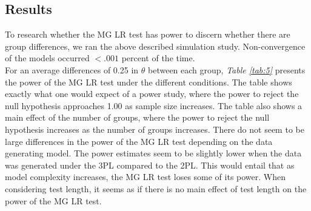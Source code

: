 \documentclass[Royal,sageapa,times,doublespace]{sagej}
\begin{document}
\subsection{Results}


To research whether the MG LR test has power to discern whether there are group differences, we ran the above described simulation study. Non-convergence of the models occurred $<.001$ percent of the time. \\
\indent For an average differences of 0.25 in $\theta$ between each group, \textit{Table \ref{tab:5}} presents the power of the MG LR test under the different conditions. The table shows exactly what one would expect of a power study, where the power to reject the null hypothesis approaches 1.00 as sample size increases. The table also shows a main effect of the number of groups, where the power to reject the null hypothesis increases as the number of groups increases. There do not seem to be large differences in the power of the MG LR test depending on the data generating model. The power estimates seem to be slightly lower when the data was generated under the 3PL compared to the 2PL. This would entail that as model complexity increases, the MG LR test loses some of its power. When considering test length, it seems as if there is no main effect of test length on the power of the MG LR test.\\
\end{document}
